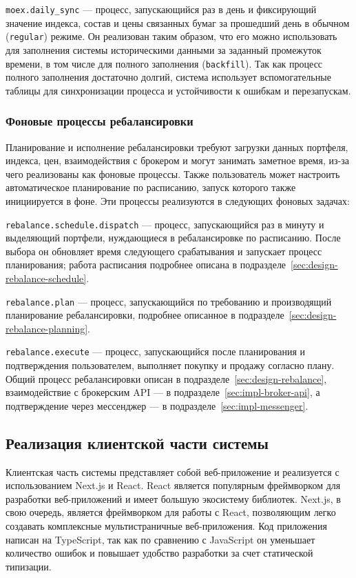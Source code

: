 \documentclass[14pt]{gost-7-32}
\begin{document}
\verb|moex.daily_sync| --- процесс, запускающийся раз в день и фиксирующий значение индекса, состав и цены связанных бумаг за прошедший день в обычном (\texttt{regular}) режиме. Он реализован таким образом, что его можно использовать для заполнения системы историческими данными за заданный промежуток времени, в том числе для полного заполнения (\texttt{backfill}). Так как процесс полного заполнения достаточно долгий, система использует вспомогательные таблицы для синхронизации процесса и устойчивости к ошибкам и перезапускам.


\subsubsection{Фоновые процессы ребалансировки}
\label{sec:impl-orchestration-rebalance}

Планирование и исполнение ребалансировки требуют загрузки данных портфеля, индекса, цен, взаимодействия с брокером и могут занимать заметное время, из-за чего реализованы как фоновые процессы. Также пользователь может настроить автоматическое планирование по расписанию, запуск которого также инициируется в фоне. Эти процессы реализуются в следующих фоновых задачах:


\verb|rebalance.schedule.dispatch| --- процесс, запускающийся раз в минуту и выделяющий портфели, нуждающиеся в ребалансировке по расписанию. После выбора он обновляет время следующего срабатывания и запускает процесс планирования; работа расписания подробнее описана в подразделе~\ref{sec:design-rebalance-schedule}.

\verb|rebalance.plan| --- процесс, запускающийся по требованию и производящий планирование ребалансировки, подробнее описанное в подразделе~\ref{sec:design-rebalance-planning}.

\verb|rebalance.execute| --- процесс, запускающийся после планирования и подтверждения пользователем, выполняет покупку и продажу согласно плану. Общий процесс ребалансировки описан в подразделе~\ref{sec:design-rebalance}, взаимодействие с брокерским API --- в подразделе~\ref{sec:impl-broker-api}, а подтверждение через мессенджер --- в подразделе~\ref{sec:impl-messenger}.

\subsection{Реализация клиентской части системы}

Клиентская часть системы представляет собой веб-приложение и реализуется с использованием Next.js и React. React является популярным фреймворком для разработки веб-приложений и имеет большую экосистему библиотек. Next.js, в свою очередь, является фреймворком для работы с React, позволяющим легко создавать комплексные мультистраничные веб-приложения. Код приложения написан на TypeScript, так как по сравнению с JavaScript он уменьшает количество ошибок и повышает удобство разработки за счет статической типизации.
\end{document}
